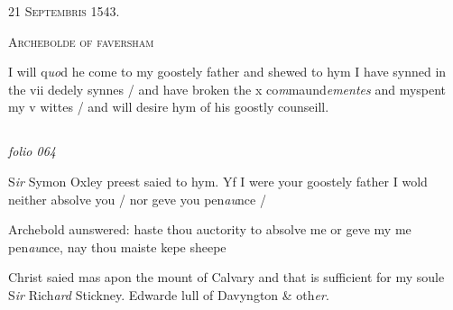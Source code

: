 \documentclass[12pt, a4paper]{book}
\begin{document}
               
				\begin{center} \begin{large} {\scshape 
                  21 Septembris 1543.} \end{large} \end{center}
			
               
               	
				\begin{center}  {\scshape Archebolde of faversham}  \end{center}
			

               	
               		
				\marginpar[\vspace{0.5cm}{\textcolor{Gray}{Confession}}]{}
			
               		
		\ifthenelse{\isodd{\thepage}}
		{\reversemarginpar}
		{\normalmarginpar}
		I will q\textit{uo}d he come to my goostely father and shewed to hym
  I have synned in the vii dedely synnes / and have broken
 the x co\textit{m}maund\textit{ementes} and myspent my v wittes / and will
 desire hym of his goostly counseill.



\dotfill
					  \subsection*{}  \subsection*{}

\textit{folio 064}



	
		\ifthenelse{\isodd{\thepage}}
		{\reversemarginpar}
		{\normalmarginpar}
		S\textit{ir} Symon Oxley preest saied to hym. Yf I
 were your goostely father I wold neither absolve
 you / nor geve you pen\textit{au}nce /
	
		\ifthenelse{\isodd{\thepage}}
		{\reversemarginpar}
		{\normalmarginpar}
		Archebold aunswered: haste thou auctority to absolve
 me or geve my me pen\textit{au}nce, nay thou maiste
 kepe sheepe
	
		\ifthenelse{\isodd{\thepage}}
		{\reversemarginpar}
		{\normalmarginpar}
		Christ saied mas apon the mount of Calvary
 and that is sufficient for my soule
 S\textit{ir} Rich\textit{ard} Stickney. Edwarde lull of Davyngton \& oth\textit{er}.
 
\end{document}
